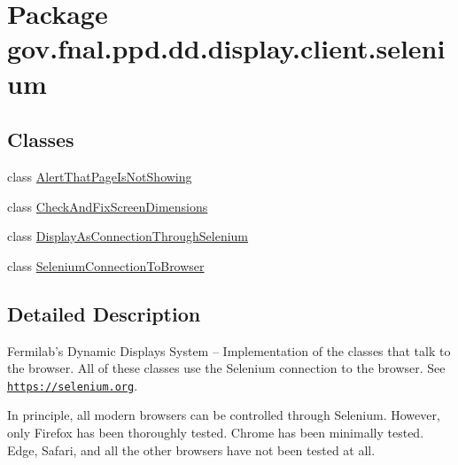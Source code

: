 \hypertarget{namespacegov_1_1fnal_1_1ppd_1_1dd_1_1display_1_1client_1_1selenium}{\section{Package gov.\-fnal.\-ppd.\-dd.\-display.\-client.\-selenium}
\label{namespacegov_1_1fnal_1_1ppd_1_1dd_1_1display_1_1client_1_1selenium}
}
\subsection*{Classes}
\begin{DoxyCompactItemize}
\item 
class \hyperlink{classgov_1_1fnal_1_1ppd_1_1dd_1_1display_1_1client_1_1selenium_1_1AlertThatPageIsNotShowing}{Alert\-That\-Page\-Is\-Not\-Showing}
\item 
class \hyperlink{classgov_1_1fnal_1_1ppd_1_1dd_1_1display_1_1client_1_1selenium_1_1CheckAndFixScreenDimensions}{Check\-And\-Fix\-Screen\-Dimensions}
\item 
class \hyperlink{classgov_1_1fnal_1_1ppd_1_1dd_1_1display_1_1client_1_1selenium_1_1DisplayAsConnectionThroughSelenium}{Display\-As\-Connection\-Through\-Selenium}
\item 
class \hyperlink{classgov_1_1fnal_1_1ppd_1_1dd_1_1display_1_1client_1_1selenium_1_1SeleniumConnectionToBrowser}{Selenium\-Connection\-To\-Browser}
\end{DoxyCompactItemize}


\subsection{Detailed Description}
Fermilab's Dynamic Displays System -- Implementation of the classes that talk to the browser. All of these classes use the Selenium connection to the browser. See \href{https://selenium.org}{\tt https\-://selenium.\-org}. 

In principle, all modern browsers can be controlled through Selenium. However, only Firefox has been thoroughly tested. Chrome has been minimally tested. Edge, Safari, and all the other browsers have not been tested at all. 